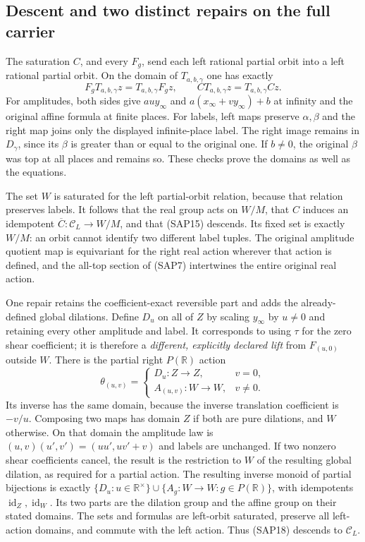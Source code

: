 \subsection{Descent and two distinct repairs on the full carrier}

The saturation $C$, and every $F_g$, send each left rational
partial orbit into a left rational partial orbit. On the domain
of $T_{a,b,\gamma}$ one has exactly
\begin{equation}\tag{SAP17}
F_gT_{a,b,\gamma}z=T_{a,b,\gamma}F_gz,
\qquad CT_{a,b,\gamma}z=T_{a,b,\gamma}Cz.
\end{equation}
For amplitudes, both sides give $au y_\infty$ and
$a(x_\infty+v y_\infty)+b$ at infinity and the original
affine formula at finite places. For labels, left maps preserve
$\alpha,\beta$ and the right map joins only the displayed
infinite-place label. The right image remains in $D_\gamma$,
since its $\beta$ is greater than or equal to the original one.
If $b\ne0$, the original $\beta$ was top at all places and
remains so. These checks prove the domains as well as the equations.

The set $W$ is saturated for the left partial-orbit relation,
because that relation preserves labels. It follows that the real
group acts on $W/M$, that $C$ induces an idempotent
$\overline C:\mathscr C_L\to W/M$, and that (SAP15) descends.
Its fixed set is exactly $W/M$: an orbit cannot identify two
different label tuples. The original amplitude quotient map is
equivariant for the right real action wherever that action is
defined, and the all-top section of (SAP7) intertwines the entire
original real action.

One repair retains the coefficient-exact reversible part and
adds the already-defined global dilations. Define $D_u$ on all
of $Z$ by scaling $y_\infty$ by $u\ne0$ and retaining every
other amplitude and label. It corresponds to using $\tau$ for
the zero shear coefficient; it is therefore a \emph{different,
explicitly declared lift} from $F_{(u,0)}$ outside $W$. There is
the partial right $P(\mathbb R)$ action
\begin{equation}\tag{SAP18}
\theta_{(u,v)}=
\begin{cases}
D_u:Z\to Z,&v=0,\\
A_{(u,v)}:W\to W,&v\ne0.
\end{cases}
\end{equation}
Its inverse has the same domain, because the inverse translation
coefficient is $-v/u$. Composing two maps has domain $Z$ if both
are pure dilations, and $W$ otherwise. On that domain the amplitude
law is $(u,v)(u',v')=(uu',uv'+v)$ and labels are unchanged.
If two nonzero shear coefficients cancel, the result is the
restriction to $W$ of the resulting global dilation, as required
for a partial action. The resulting inverse monoid of partial
bijections is exactly
$\{D_u:u\in\mathbb R^\times\}\cup
 \{A_g:W\to W:g\in P(\mathbb R)\}$,
with idempotents $\operatorname{id}_Z,\operatorname{id}_W$.
Its two parts are the dilation group and the affine group on
their stated domains. The sets and formulas are left-orbit
saturated, preserve all left-action domains, and commute with
the left action. Thus (SAP18) descends to $\mathscr C_L$.

